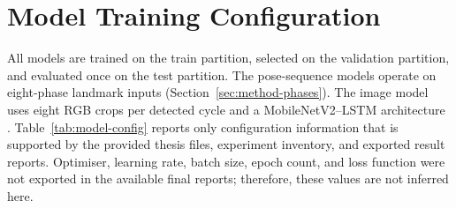 \section{Model Training Configuration}
\label{sec:setup-training}

All models are trained on the train partition, selected on the validation
partition, and evaluated once on the test partition. The pose-sequence models
operate on eight-phase landmark inputs (Section~\ref{sec:method-phases}). The
image model uses eight RGB crops per detected cycle and a MobileNetV2--LSTM
architecture \cite{sandler2018mobilenetv2, donahue2015lrcn}. Table~\ref{tab:model-config}
reports only configuration information that is supported by the provided thesis
files, experiment inventory, and exported result reports. Optimiser, learning
rate, batch size, epoch count, and loss function were not exported in the
available final reports; therefore, these values are not inferred here.

